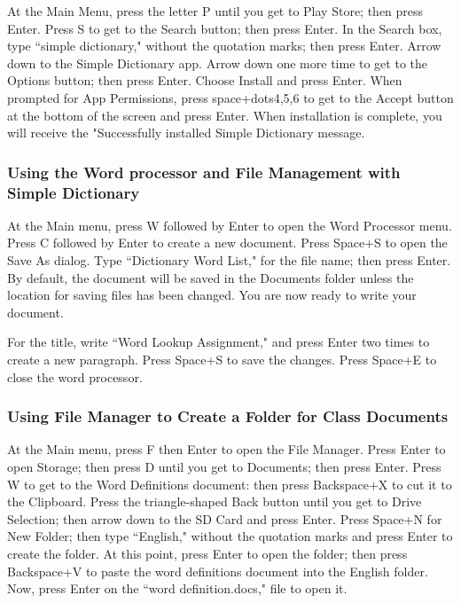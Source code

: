 \documentclass[10pt,letterpaper,twoside]{report}
\begin{document}
{{{At the Main Menu, press the letter P until you get to Play Store; then press Enter.
Press S to get to the Search button; then press Enter.
In the Search box, type ``simple dictionary," without the quotation marks; then press Enter.
Arrow down to the Simple Dictionary app.
Arrow down one more time to get to the Options button; then press Enter.
Choose Install and press Enter.
When prompted for App Permissions, press space+dots4,5,6 to get to the Accept button at the bottom of the screen and press Enter.
When installation is complete, you will receive the "Successfully installed Simple Dictionary message.

\subsubsection{Using the Word processor and File Management with Simple Dictionary}

At the Main menu, press W followed by Enter to open the Word Processor menu.
Press C followed by Enter to create a new document.
Press Space+S to open the Save As dialog.
Type ``Dictionary Word List," for the file name; then press Enter. By default, the document will be saved in the Documents folder unless the location for saving files has been changed. You are now ready to write your document.

For the title, write ``Word Lookup Assignment," and press Enter two times to create a new paragraph.
Press Space+S to save the changes.
Press Space+E to close the word processor.

\subsubsection{Using File Manager to Create a Folder for Class Documents}

At the Main menu, press F then Enter to open the File Manager.
Press Enter to open Storage; then press D until you get to Documents; then press Enter.
Press W to get to the Word Definitions document: then press Backspace+X to cut it to the Clipboard.
Press the triangle-shaped Back button until you get to Drive Selection; then arrow down to the SD Card and press Enter.
Press Space+N for New Folder; then type ``English," without the quotation marks and press Enter to create the folder.
At this point, press Enter to open the folder; then press Backspace+V to paste the word definitions document into the English folder.
Now, press Enter on the ``word definition.docs," file to open it.

}}}
\end{document}
